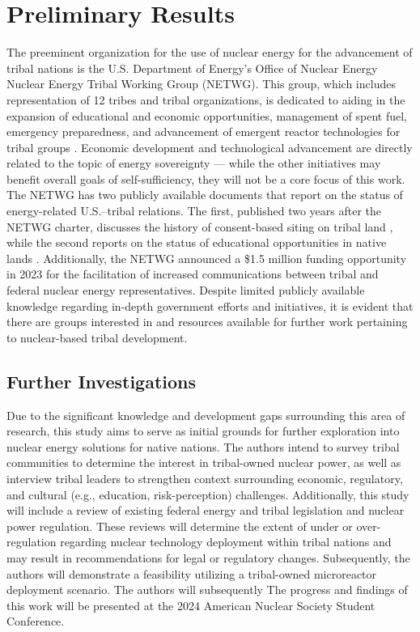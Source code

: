 \documentclass{anstrans}
\begin{document}
\section{Preliminary Results}
The preeminent organization for the use of nuclear energy for the advancement of
tribal nations is the U.S. Department of Energy's Office of Nuclear Energy
Nuclear Energy Tribal Working Group (NETWG). This group, which includes
representation of 12 tribes and tribal organizations, is dedicated to aiding in
the expansion of educational and economic opportunities, management of spent
fuel, emergency preparedness, and advancement of emergent reactor technologies
for tribal groups \cite{department_of_energy_nuclear_2023}. Economic development
and technological advancement are directly related to the topic of energy
sovereignty — while the other initiatives may benefit overall goals of
self-sufficiency, they will not be a core focus of this work. The NETWG has two
publicly available documents that report on the status of energy-related
U.S.–tribal relations. The first, published two years after the NETWG charter,
discusses the history of consent-based siting on tribal land
\cite{nuclear_energy_tribal_working_group_2016}, while the second reports on the
status of educational opportunities in native lands
\cite{nuclear_energy_tribal_working_group_2016}. Additionally, the NETWG
announced a \$1.5 million funding opportunity in 2023 for the facilitation of
increased communications between tribal and federal nuclear energy
representatives. Despite limited publicly available knowledge regarding in-depth
government efforts and initiatives, it is evident that there are groups
interested in and resources available for further work pertaining to
nuclear-based tribal development.

\subsection{Further Investigations}
Due to the significant knowledge and development gaps surrounding this area of
research, this study aims to serve as initial grounds for further exploration
into nuclear energy solutions for native nations. The authors intend to survey
tribal communities to determine the interest in tribal-owned nuclear power, as
well as interview tribal leaders to strengthen context surrounding economic,
regulatory, and cultural (e.g., education, risk-perception) challenges.
Additionally, this study will include a review of existing federal energy and
tribal legislation and nuclear power regulation. These reviews will determine
the extent of under or over-regulation regarding nuclear technology deployment
within tribal nations and may result in recommendations for legal or regulatory
changes. Subsequently, the authors will demonstrate a feasibility utilizing a
tribal-owned microreactor deployment scenario. The authors will subsequently The
progress and findings of this work will be presented at the 2024 American
Nuclear Society Student Conference.
\end{document}
